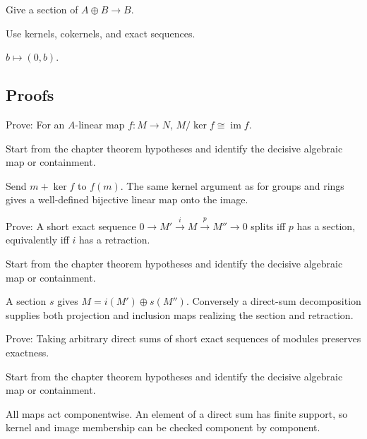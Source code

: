 \begin{exercise}[Section]\label{exr:v09-expand-05}
Give a section of $A\oplus B\to B$.
\end{exercise}
\begin{hint}
Use kernels, cokernels, and exact sequences.
\end{hint}
\begin{solution}
$b\mapsto(0,b)$.
\end{solution}

\subsection*{Proofs}

\begin{exercise}\label{exr:v09-expand-06}
Prove: For an $A$-linear map $f:M\to N$, $M/\ker f\cong\operatorname{im}f$.
\end{exercise}
\begin{hint}
Start from the chapter theorem hypotheses and identify the decisive algebraic map or containment.
\end{hint}
\begin{solution}
Send $m+\ker f$ to $f(m)$. The same kernel argument as for groups and rings gives a well-defined bijective linear map onto the image.
\end{solution}

\begin{exercise}\label{exr:v09-expand-07}
Prove: A short exact sequence $0\to M'\xrightarrow{i}M\xrightarrow{p}M''\to0$ splits iff $p$ has a section, equivalently iff $i$ has a retraction.
\end{exercise}
\begin{hint}
Start from the chapter theorem hypotheses and identify the decisive algebraic map or containment.
\end{hint}
\begin{solution}
A section $s$ gives $M=i(M')\oplus s(M'')$. Conversely a direct-sum decomposition supplies both projection and inclusion maps realizing the section and retraction.
\end{solution}

\begin{exercise}\label{exr:v09-expand-08}
Prove: Taking arbitrary direct sums of short exact sequences of modules preserves exactness.
\end{exercise}
\begin{hint}
Start from the chapter theorem hypotheses and identify the decisive algebraic map or containment.
\end{hint}
\begin{solution}
All maps act componentwise. An element of a direct sum has finite support, so kernel and image membership can be checked component by component.
\end{solution}

